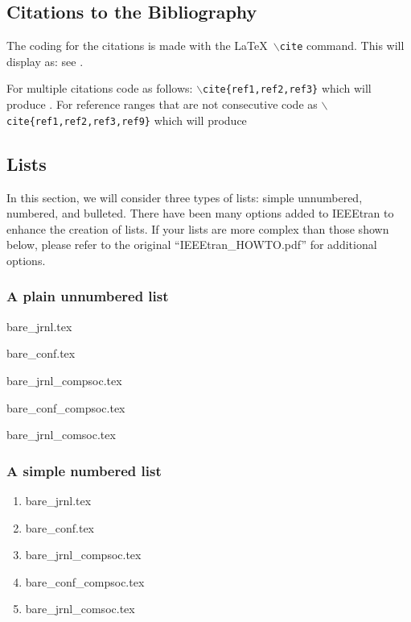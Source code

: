 \documentclass[lettersize,journal]{IEEEtran}
\begin{document}
\subsection{Citations to the Bibliography}
The coding for the citations is made with the \LaTeX\ $\backslash${\tt{cite}} command. 
This will display as: see \cite{ref1}.

For multiple citations code as follows: {\tt{$\backslash$cite\{ref1,ref2,ref3\}}}
 which will produce \cite{ref1,ref2,ref3}. For reference ranges that are not consecutive code as {\tt{$\backslash$cite\{ref1,ref2,ref3,ref9\}}} which will produce  \cite{ref1,ref2,ref3,ref9}

\subsection{Lists}
In this section, we will consider three types of lists: simple unnumbered, numbered, and bulleted. There have been many options added to IEEEtran to enhance the creation of lists. If your lists are more complex than those shown below, please refer to the original ``IEEEtran\_HOWTO.pdf'' for additional options.\\

\subsubsection*{\bf A plain  unnumbered list}
\begin{list}{}{}
\item{bare\_jrnl.tex}
\item{bare\_conf.tex}
\item{bare\_jrnl\_compsoc.tex}
\item{bare\_conf\_compsoc.tex}
\item{bare\_jrnl\_comsoc.tex}
\end{list}

\subsubsection*{\bf A simple numbered list}
\begin{enumerate}
\item{bare\_jrnl.tex}
\item{bare\_conf.tex}
\item{bare\_jrnl\_compsoc.tex}
\item{bare\_conf\_compsoc.tex}
\item{bare\_jrnl\_comsoc.tex}
\end{enumerate}
\end{document}
